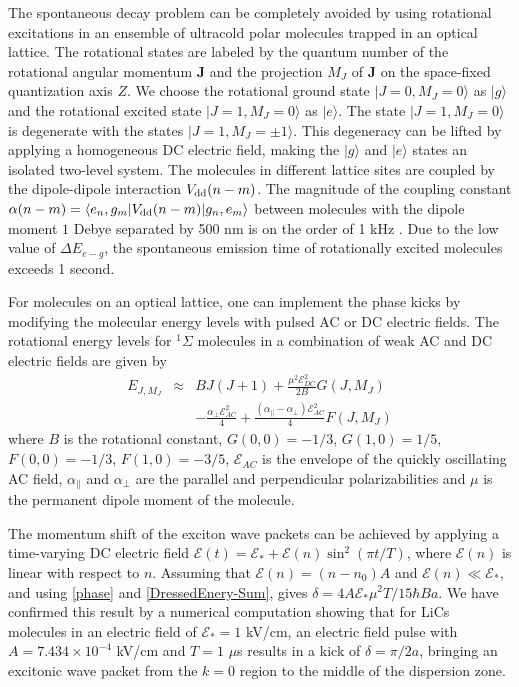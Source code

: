 The spontaneous decay problem can be completely avoided by using rotational excitations in an ensemble of
ultracold polar molecules trapped in an optical lattice.
The rotational states are labeled by the quantum
number of the rotational angular momentum $\bm{J}$ and the
projection $M_J$ of $\bm{J}$ on the space-fixed quantization axis
$Z$. We choose the rotational ground state $|J=0, M_J=0\rangle$ as
$|g\rangle$ and the rotational excited state $|J=1, M_J = 0
\rangle$ as $|e\rangle$. The state $|J=1, M_J = 0 \rangle$ is
degenerate with the states $|J=1, M_J = \pm 1 \rangle$. This
degeneracy can be lifted by applying a homogeneous DC electric
field, making the $|g\rangle$ and $|e\rangle$ states an isolated
two-level system. The molecules in different lattice sites are
coupled by the dipole-dipole interaction $V_{\rm dd}(n-m)$.
The magnitude of
the coupling constant $\alpha(n-m) = \langle e_{n} , g_{m} |
{V}_{\rm dd}(n-m) | g_{n}, e_{m} \rangle$ between molecules with
the dipole moment $1$ Debye separated by 500 nm is on the order of
1 kHz \cite{felipe}. Due to the low value of $\Delta E_{e-g}$, the spontaneous emission time of
rotationally excited molecules  exceeds 1 second.


For molecules on an optical lattice, one can implement the phase
kicks by modifying the molecular energy levels with pulsed AC or
DC electric fields. The rotational energy levels for $^1\Sigma$
molecules in a combination of weak AC and DC electric fields are
given by \cite{friedrich-95}
\begin{eqnarray}
E_{J,M_J}  &\approx&  BJ(J+1) +  \frac{\mu^2 \mathcal{E}_{DC}^2
}{2B} G(J,M_J) \nonumber \\
&& - \frac{ \alpha_{\perp}\mathcal{E}_{AC}^2 }{4} + \frac{
(\alpha_{||}-\alpha_{\perp})\mathcal{E}_{AC}^2 }{4}F(J,M_J)
 \label{DressedEnery-Sum}
\end{eqnarray}
%
where $B$ is the rotational constant,  $G(0,0) = -1/3$, $G(1,0) =
1/5$, $F(0,0) = -1/3$, $F(1,0) = -3/5$, $\mathcal{E}_{AC}$ is the
envelope of the quickly oscillating AC field, $\alpha_\|$ and
$\alpha_{\perp}$ are the parallel and perpendicular
polarizabilities and $\mu$ is the permanent dipole moment of the
molecule.

The momentum shift of the exciton wave packets can be achieved by
applying a time-varying DC electric field $\mathcal{E}(t)
=\mathcal{E}_{\ast} + \mathcal{E}(n)\sin^{2}(\pi t/T)$, where
$\mathcal{E}(n)$ is linear with respect to $n$. Assuming that
$\mathcal{E}(n) = (n-n_0) A$ and $\mathcal{E}(n) \ll
\mathcal{E}_{{\ast}}$, and using \autoref{phase} and
\autoref{DressedEnery-Sum}, gives  $\delta = 4 A
\mathcal{E}_{{\ast}} \mu^2 T / 15 \hbar B a$. We have confirmed
this result by a numerical computation showing that for LiCs
molecules in an electric field of $\mathcal{E}_{{\ast}}=1$ kV/cm,
an electric field pulse with $A=7.434\times 10^{-4}$ kV/cm and
$T=1$ $\mu$s results in a kick of $\delta = \pi/2 a$, bringing an
excitonic wave packet from the $k=0$ region to the middle of the
dispersion zone.

